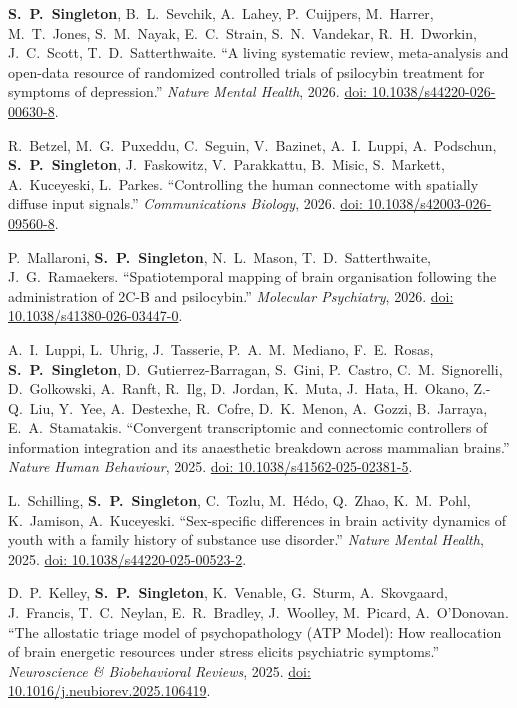 \documentclass[11pt, letterpaper]{article}
\newcommand{\me}{\textbf{S.\ P.\ Singleton}}
\begin{document}
\begin{etaremune}[itemsep=5pt]
  \item \me, B.\ L.\ Sevchik, A.\ Lahey, P.\ Cuijpers, M.\ Harrer, M.\ T.\ Jones, S.\ M.\ Nayak, E.\ C.\ Strain, S.\ N.\ Vandekar, R.\ H.\ Dworkin, J.\ C.\ Scott, T.\ D.\ Satterthwaite.
    ``A living systematic review, meta-analysis and open-data resource of randomized controlled trials of psilocybin treatment for symptoms of depression.''
    \textit{Nature Mental Health}, 2026.
    \href{https://doi.org/10.1038/s44220-026-00630-8}{doi: 10.1038/s44220-026-00630-8}.

  \item R.\ Betzel, M.\ G.\ Puxeddu, C.\ Seguin, V.\ Bazinet, A.\ I.\ Luppi, A.\ Podschun, \me, J.\ Faskowitz, V.\ Parakkattu, B.\ Misic, S.\ Markett, A.\ Kuceyeski, L.\ Parkes.
    ``Controlling the human connectome with spatially diffuse input signals.''
    \textit{Communications Biology}, 2026.
    \href{https://doi.org/10.1038/s42003-026-09560-8}{doi: 10.1038/s42003-026-09560-8}.

  \item P.\ Mallaroni, \me, N.\ L.\ Mason, T.\ D.\ Satterthwaite, J.\ G.\ Ramaekers.
    ``Spatiotemporal mapping of brain organisation following the administration of 2C-B and psilocybin.''
    \textit{Molecular Psychiatry}, 2026.
    \href{https://doi.org/10.1038/s41380-026-03447-0}{doi: 10.1038/s41380-026-03447-0}.

  \item A.\ I.\ Luppi, L.\ Uhrig, J.\ Tasserie, P.\ A.\ M.\ Mediano, F.\ E.\ Rosas, \me, D.\ Gutierrez-Barragan, S.\ Gini, P.\ Castro, C.\ M.\ Signorelli, D.\ Golkowski, A.\ Ranft, R.\ Ilg, D.\ Jordan, K.\ Muta, J.\ Hata, H.\ Okano, Z.-Q.\ Liu, Y.\ Yee, A.\ Destexhe, R.\ Cofre, D.\ K.\ Menon, A.\ Gozzi, B.\ Jarraya, E.\ A.\ Stamatakis.
    ``Convergent transcriptomic and connectomic controllers of information integration and its anaesthetic breakdown across mammalian brains.''
    \textit{Nature Human Behaviour}, 2025.
    \href{https://doi.org/10.1038/s41562-025-02381-5}{doi: 10.1038/s41562-025-02381-5}.

  \item L.\ Schilling, \me, C.\ Tozlu, M.\ H\'{e}do, Q.\ Zhao, K.\ M.\ Pohl, K.\ Jamison, A.\ Kuceyeski.
    ``Sex-specific differences in brain activity dynamics of youth with a family history of substance use disorder.''
    \textit{Nature Mental Health}, 2025.
    \href{https://doi.org/10.1038/s44220-025-00523-2}{doi: 10.1038/s44220-025-00523-2}.

  \item D.\ P.\ Kelley, \me, K.\ Venable, G.\ Sturm, A.\ Skovgaard, J.\ Francis, T.\ C.\ Neylan, E.\ R.\ Bradley, J.\ Woolley, M.\ Picard, A.\ O'Donovan.
    ``The allostatic triage model of psychopathology (ATP Model): How reallocation of brain energetic resources under stress elicits psychiatric symptoms.''
    \textit{Neuroscience \& Biobehavioral Reviews}, 2025.
    \href{https://doi.org/10.1016/j.neubiorev.2025.106419}{doi: 10.1016/j.neubiorev.2025.106419}.


\end{etaremune}
\end{document}
